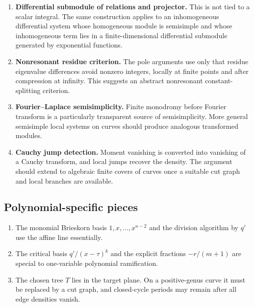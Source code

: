 \documentclass[11pt]{article}
\numberwithin{equation}{section}
\theoremstyle{definition}
\theoremstyle{remark}
\begin{document}
\begin{enumerate}[leftmargin=2.2em]
\item \textbf{Differential submodule of relations and projector.}
This is not tied to a scalar integral.  The same construction applies
to an inhomogeneous differential system whose homogeneous module is
semisimple and whose inhomogeneous term lies in a
finite-dimensional differential submodule generated by exponential functions.

\item \textbf{Nonresonant residue criterion.}
The pole arguments use only that residue eigenvalue differences avoid
nonzero integers, locally at finite points and after compression at infinity.
This suggests an abstract nonresonant constant-splitting criterion.

\item \textbf{Fourier--Laplace semisimplicity.}
Finite monodromy before Fourier transform is a particularly transparent
source of semisimplicity.  More general semisimple local systems on curves
should produce analogous transformed modules.

\item \textbf{Cauchy jump detection.}
Moment vanishing is converted into vanishing of a Cauchy transform, and local
jumps recover the density.  The argument should extend to algebraic finite
covers of curves once a suitable cut graph and local branches are available.
\end{enumerate}

\subsection{Polynomial-specific pieces}

\begin{enumerate}[leftmargin=2.2em]
\item The monomial Brieskorn basis $1,x,\ldots,x^{n-2}$ and the division
algorithm by $q'$ use the affine line essentially.

\item The critical basis $q'/(x-\tau)^k$ and the explicit fractions
$-r/(m+1)$ are special to one-variable polynomial ramification.

\item The chosen tree $T$ lies in the target plane.  On a positive-genus
curve it must be replaced by a cut graph, and closed-cycle periods may remain
after all edge densities vanish.
\end{enumerate}
\end{document}
